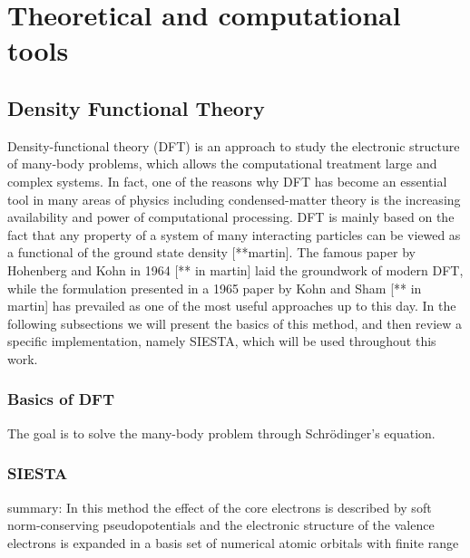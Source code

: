 
\chapter{Theoretical and computational tools} %

\label{Chapter1} %


\newcommand{\keyword}[1]{\textbf{#1}}
\newcommand{\tabhead}[1]{\textbf{#1}}
\newcommand{\code}[1]{\texttt{#1}}
\newcommand{\file}[1]{\texttt{\bfseries#1}}
\newcommand{\option}[1]{\texttt{\itshape#1}}

\section{Density Functional Theory}

Density-functional theory (DFT) is an approach to study the electronic structure of many-body problems, which allows the computational treatment large and complex systems. In fact, one of the reasons why DFT has become an essential tool in many areas of physics including condensed-matter theory is the increasing availability and power of computational processing. DFT is mainly based on the fact that any property of a system of many interacting particles can be viewed as a functional of the ground state
density [**martin]. The famous paper by Hohenberg and Kohn in 1964 [** in martin] laid the groundwork of modern DFT, while the formulation presented in a 1965 paper by Kohn and Sham [** in martin] has prevailed as one of the most useful approaches up to this day. In the following subsections we will present the basics of this method, and then review a specific implementation, namely SIESTA, which will be used throughout this work.


\subsection{Basics of DFT}
The goal is to solve the many-body problem through Schrödinger's equation.

\subsection{SIESTA}
summary: In this method the effect of
the core electrons is described by soft norm-conserving
pseudopotentials and the electronic structure of the valence
electrons is expanded in a basis set of numerical atomic orbitals with finite range

